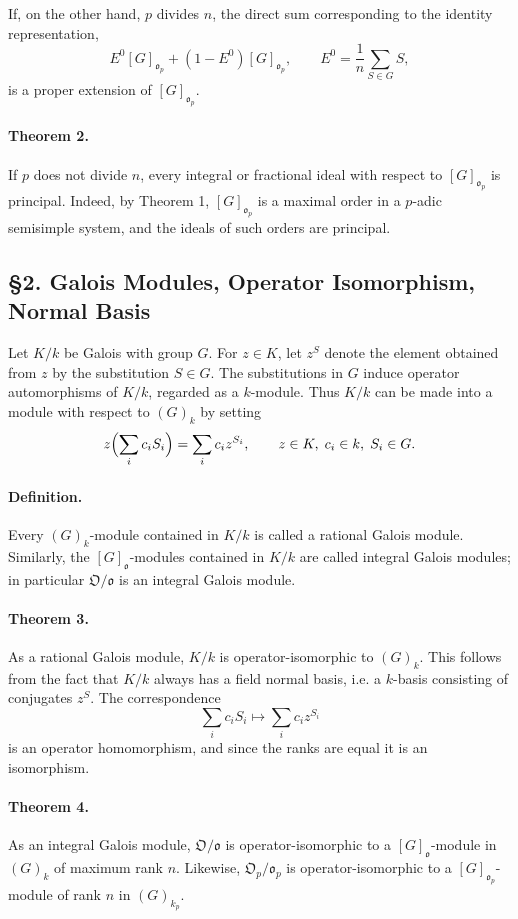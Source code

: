 \documentclass[11pt]{article}
\providecommand{\frako}{\mathfrak o}
\providecommand{\frakO}{\mathfrak O}
\begin{document}
If, on the other hand, \(p\) divides \(n\), the direct sum corresponding to the identity representation,
\[
        E^0 [G]_{\frako_p}+(1-E^0)[G]_{\frako_p},
        \qquad
        E^0=\frac1n\sum_{S\in G}S,
\]
is a proper extension of \([G]_{\frako_p}\).

\paragraph{Theorem 2.}
If \(p\) does not divide \(n\), every integral or fractional ideal with respect to \([G]_{\frako_p}\) is principal. Indeed, by Theorem 1, \([G]_{\frako_p}\) is a maximal order in a \(p\)-adic semisimple system, and the ideals of such orders are principal.

\subsection*{§2. Galois Modules, Operator Isomorphism, Normal Basis}

Let \(K/k\) be Galois with group \(G\). For \(z\in K\), let \(z^S\) denote the element obtained from \(z\) by the substitution \(S\in G\). The substitutions in \(G\) induce operator automorphisms of \(K/k\), regarded as a \(k\)-module. Thus \(K/k\) can be made into a module with respect to \((G)_k\) by setting
\[
        z\Bigl(\sum_i c_iS_i\Bigr)=\sum_i c_i z^{S_i},
        \qquad z\in K,\; c_i\in k,\; S_i\in G.
\]

\paragraph{Definition.}
Every \((G)_k\)-module contained in \(K/k\) is called a rational Galois module. Similarly, the \([G]_{\frako}\)-modules contained in \(K/k\) are called integral Galois modules; in particular \(\frakO/\frako\) is an integral Galois module.

\paragraph{Theorem 3.}
As a rational Galois module, \(K/k\) is operator-isomorphic to \((G)_k\). This follows from the fact that \(K/k\) always has a field normal basis, i.e. a \(k\)-basis consisting of conjugates \(z^S\). The correspondence
\[
        \sum_i c_iS_i\longmapsto \sum_i c_i z^{S_i}
\]
is an operator homomorphism, and since the ranks are equal it is an isomorphism.

\paragraph{Theorem 4.}
As an integral Galois module, \(\frakO/\frako\) is operator-isomorphic to a \([G]_{\frako}\)-module in \((G)_k\) of maximum rank \(n\). Likewise, \(\frakO_p/\frako_p\) is operator-isomorphic to a \([G]_{\frako_p}\)-module of rank \(n\) in \((G)_{k_p}\).
\end{document}
